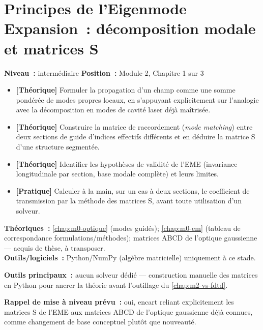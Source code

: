 
\chapter{Principes de l'Eigenmode Expansion~: décomposition modale et matrices S}
\label{chap:m2-principes}

\noindent\textbf{Niveau~:} intermédiaire \hfill \textbf{Position~:} Module 2, Chapitre 1 sur 3

\begin{objectifs}
\begin{itemize}[leftmargin=1.4em]
  \item \textbf{[Théorique]} Formuler la propagation d'un champ comme une somme pondérée de modes propres locaux, en s'appuyant explicitement sur l'analogie avec la décomposition en modes de cavité laser déjà maîtrisée.
  \item \textbf{[Théorique]} Construire la matrice de raccordement (\emph{mode matching}) entre deux sections de guide d'indices effectifs différents et en déduire la matrice S d'une structure segmentée.
  \item \textbf{[Théorique]} Identifier les hypothèses de validité de l'EME (invariance longitudinale par section, base modale complète) et leurs limites.
  \item \textbf{[Pratique]} Calculer \og à la main\fg{}, sur un cas à deux sections, le coefficient de transmission par la méthode des matrices S, avant toute utilisation d'un solveur.
\end{itemize}
\end{objectifs}

\begin{prerequis}
\textbf{Théoriques~:} \cref{chap:m0-optique} (modes guidés); \cref{chap:m0-em} (tableau de correspondance formulations/méthodes); matrices ABCD de l'optique gaussienne — acquis de thèse, à transposer.\\
\textbf{Outils/logiciels~:} Python/NumPy (algèbre matricielle) uniquement à ce stade.
\end{prerequis}

\noindent\textbf{Outils principaux~:} aucun solveur dédié — construction manuelle des matrices en Python pour ancrer la théorie avant l'outillage du \cref{chap:m2-vs-fdtd}.

\noindent\textbf{Rappel de mise à niveau prévu~:} oui, encart reliant explicitement les matrices S de l'EME aux matrices ABCD de l'optique gaussienne déjà connues, comme changement de base conceptuel plutôt que nouveauté.

